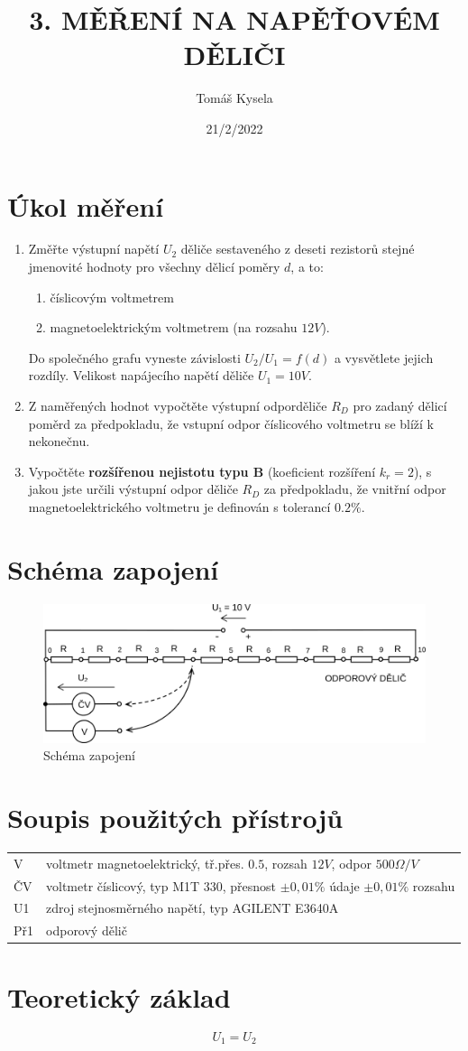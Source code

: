 \documentclass[11pt]{article}
\title{\textbf{3. MĚŘENÍ NA NAPĚŤOVÉM DĚLIČI}}
\author{Tomáš Kysela}
\date{21/2/2022}
\begin{document}
\maketitle
\thispagestyle{empty}

\section{Úkol měření}
\begin{enumerate}
\item Změřte výstupní napětí $U_2$ děliče sestaveného z deseti rezistorů stejné jmenovité hodnoty pro všechny dělicí poměry $d$, a to:
   \begin{enumerate}
   \item číslicovým voltmetrem
   \item magnetoelektrickým voltmetrem (na rozsahu $12V$).
   \end{enumerate}
   Do společného grafu vyneste závislosti $U_2 /U_1 = f(d)$ a vysvětlete jejich rozdíly. Velikost napájecího napětí děliče $U_1 = 10 V$.
   
\item Z naměřených hodnot vypočtěte výstupní odporděliče $R_D$ pro zadaný dělicí poměrd za předpokladu, že vstupní odpor číslicového voltmetru se blíží k nekonečnu.

\item Vypočtěte \textbf{rozšířenou nejistotu typu B} (koeficient rozšíření $k_r = 2$), s jakou jste určili výstupní odpor děliče $R_D$ za předpokladu, že vnitřní odpor magnetoelektrického voltmetru je definován s tolerancí $0.2\%$.
\end{enumerate}
\section{Schéma zapojení}
\begin{figure}[htp]
\centering
\includegraphics[scale=1.00]{LAB3.png}
\caption{Schéma zapojení}
\end{figure}
\section{Soupis použitých přístrojů}
\begin{tabular}{ll}
	V & voltmetr magnetoelektrický, tř.přes. $0.5$, rozsah $12 V$, odpor $500 \Omega/V$\\
	ČV & voltmetr číslicový, typ M1T 330, přesnost $\pm 0,01\%$ údaje $\pm 0,01\%$ rozsahu\\
	U1 & zdroj stejnosměrného napětí, typ AGILENT E3640A\\
	Př1 & odporový dělič
\end{tabular}

\section{Teoretický základ}

\begin{equation}
U_1 = U_2
\end{equation}
\end{document}
